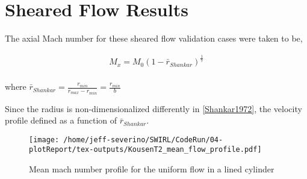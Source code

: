 \section{Sheared Flow Results}

The axial Mach number for these sheared flow validation cases were taken to be,

\begin{align}
    M_x = M_0 \left( 1 - \bar{r}_{Shankar} \right)^{ \frac{1}{7}}
    \label{eqn:cylindricalShear} \\
\end{align}

where $\bar{r}_{Shankar} = \frac{r_{min}}{r_{max}-r_{min}} = \frac{r_{min}}{b}$ 

Since the radius is non-dimensionalized differently in \ref{Shankar1972}, the 
velocity profile defined as a function of $\bar{r}_{Shankar}$.


\begin{figure}[h!]
    \centering
    \texttt{[image: /home/jeff-severino/SWIRL/CodeRun/04-plotReport/tex-outputs/KousenT2\_mean\_flow\_profile.pdf]}
    \caption{Mean mach number profile for the uniform flow in a lined cylinder}
    \label{fig:1}
\end{figure}

